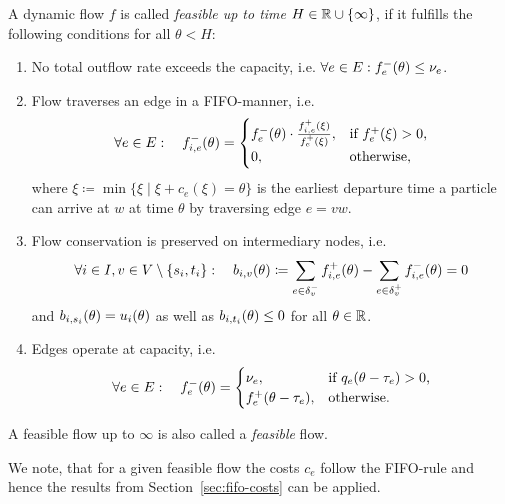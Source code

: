 \begin{definition}
    A dynamic flow $f$ is called \emph{feasible up to time $H\in\mathbb{R} \cup \{\infty \}$}, if it fulfills the following conditions for all $\theta < H$:
    \begin{enumerate}[label=(F\arabic*)]
        \item No total outflow rate exceeds the capacity, i.e. $\forall e\in E: {f}^-_e(\theta)\leq \nu_e$.
        \item Flow traverses an edge in a FIFO-manner, i.e. \[
            \forall e\in E: \quad 
            {f}^-_{i,e}(\theta) = \begin{cases}
                {f}^-_e(\theta) \cdot \frac{{f}^+_{i,e}(\xi)}{{f}^+_e(\xi)}, & \text{if ${f}^+_e(\xi) > 0$,}\\
                0, & \text{otherwise,}
        \end{cases}
        \]
        where $\xi\coloneqq \min \{ \xi  \mid \xi + c_e(\xi) = \theta \}$ is the earliest departure time a particle can arrive at $w$ at time $\theta$ by traversing edge $e=vw$. 
        \item Flow conservation is preserved on intermediary nodes, i.e. \[\forall i\in I, v\in V\setminus\{ s_i, t_i \}: \quad
        b_{i,v}(\theta)\coloneqq \sum_{e\in\delta^-_{v}}{f}^+_{i,e}(\theta) - \sum_{e\in\delta^+_{v}} {f}^-_{i,e}(\theta) = 0 \]
        and $b_{i,s_i}(\theta) = u_i(\theta)$ as well as $b_{i,t_i}(\theta) \leq 0$ for all $\theta\in\mathbb{R}$.

        \item Edges operate at capacity, i.e. 
        \[
            \forall e\in E: \quad {f}^-_{e}(\theta) = \begin{cases}
                \nu_e, &\text{if $q_e(\theta - \tau_e)>0$,} \\
                {f}^+_e(\theta-\tau_e), &\text{otherwise.}
            \end{cases}
        \]
    \end{enumerate}
    A feasible flow up to $\infty$ is also called a \emph{feasible} flow.
\end{definition}

We note, that for a given feasible flow the costs $c_e$ follow the FIFO-rule and hence the results from Section~\ref{sec:fifo-costs} can be applied.
